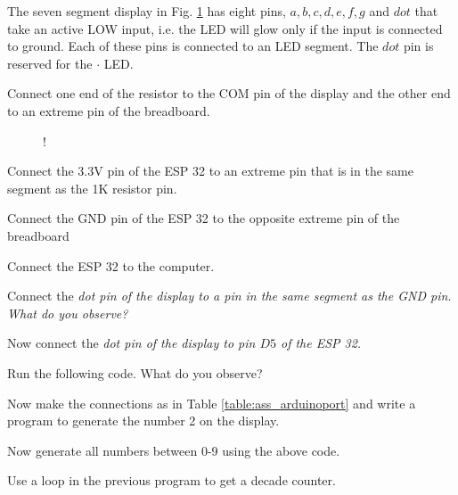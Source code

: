 \documentclass[journal,12pt,twocolumn]{IEEEtran}
\begin{document}
The seven segment display in Fig. \ref{fig:sevenseg} has eight pins, $a, b, c, d, e, f, g$ and $dot$ that take an active LOW input, i.e.  the LED will glow only if the input is connected to ground.  Each of these pins is connected to an LED segment.  The $dot$ pin is  reserved for the $\cdot$ LED.  

%

\begin{problem}
	Connect one end of the resistor to the COM pin of the display and the other end to an extreme pin of the breadboard.	
\end{problem}
%
%
%
\begin{figure}[!h]
\begin{center}
 {!} {

}
\end{center}
\caption{}
\label{fig:sevenseg}
\end{figure}
\begin{problem}
	Connect the 3.3V pin of the ESP 32 to an  extreme pin that is in the same segment as the 1K resistor pin. 
	\end{problem}	
\begin{problem}
	Connect the GND pin of the ESP 32 to the opposite extreme pin of the breadboard
\end{problem}
\begin{problem}
	Connect the ESP 32 to the computer.
\end{problem}
\begin{problem}
	Connect the \em{dot} pin of the display to a pin in the same segment as the GND pin.  What do you observe?
\end{problem}
\begin{problem}
	Now connect the \em{dot} pin of the display to pin $D5$ of the ESP 32.
\end{problem}
\begin{problem}
Run the following code.  What do you observe?
\end{problem}

\begin{problem}
Now make the connections as in Table \ref{table:ass_arduinoport} and write a program to generate the number 2 on the display.  
\end{problem}

\begin{problem}
Now generate all numbers between 0-9 using the above code.
\end{problem}
\begin{problem}
Use a loop in the previous program to get a decade counter.
\end{problem}
\end{document}
